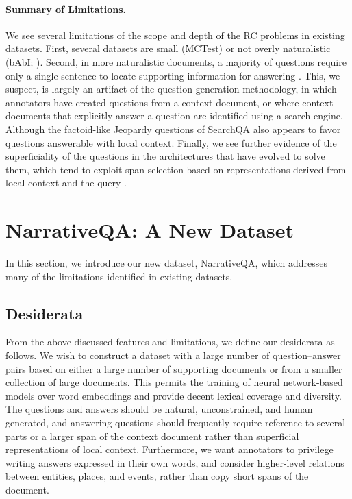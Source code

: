 \documentclass[11pt,letterpaper]{article}
\begin{document}
\paragraph{Summary of Limitations.}
We see several limitations of the scope and depth of the RC problems in existing datasets. First, several datasets are small (MCTest) or not overly naturalistic (bAbI; ).
Second, in more naturalistic documents, a majority of questions require only a single sentence to locate supporting information for answering \cite{chen_examine_cnn,squad}. This, we suspect, is largely an artifact of the question generation methodology, in which annotators have created questions from a context document, or where context documents that explicitly answer a question are identified using a search engine. Although the factoid-like Jeopardy questions of SearchQA also appears to favor questions answerable with local context.
Finally, we see further evidence of the superficiality of the questions in the architectures that have evolved to solve them, which tend to exploit span selection based on representations derived from local context and the query \cite{seo2016bidirectional,rnet}.

\section{NarrativeQA: A New Dataset}
\label{sec:narrativeqa}

In this section, we introduce our new dataset, NarrativeQA, which addresses many of the limitations identified in existing datasets.
\subsection{Desiderata}
\label{sec:desiderata}



From the above discussed features and limitations, we define our desiderata as follows. We wish to construct a dataset with a large number of question--answer pairs based on either a large number of supporting documents or from a smaller collection of large documents. This permits the training of neural network-based models over word embeddings and provide decent lexical coverage and diversity. The questions and answers should be natural, unconstrained, and human generated, and answering questions should frequently require reference to several parts or a larger span of the context document rather than superficial representations of local context. Furthermore, we want annotators to privilege writing answers expressed in their own words, and consider higher-level relations between entities, places, and events, rather than copy short spans of the document.
\end{document}
